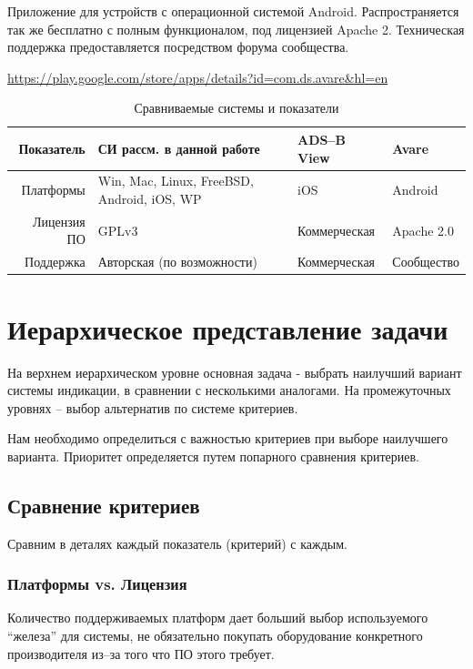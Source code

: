 \documentclass[a4paper,12pt]{report} %
\begin{document}
Приложение для устройств с операционной системой Android. Распространяется так
же бесплатно с полным функционалом, под лицензией Apache 2. Техническая
поддержка предоставляется посредством форума сообщества.

\url{https://play.google.com/store/apps/details?id=com.ds.avare&hl=en}


\begin{table}[!h]
  \caption{Сравниваемые системы и показатели}
  \begin{tabular}{ | r | p{6cm} | l | l |}
    \hline
    Показатель   & СИ рассм. в данной работе                  & ADS--B View   & Avare  \\
    \hline
    Платформы    & Win, Mac, Linux, FreeBSD, Android, iOS, WP & iOS           & Android \\
    \hline
    Лицензия ПО  & GPLv3                                      & Коммерческая  & Apache 2.0 \\
    \hline
    Поддержка    & Авторская (по возможности)                 & Коммерческая  & Сообщество \\
    \hline
  \end{tabular}
\end{table}

\section{Иерархическое представление задачи}

На верхнем иерархическом уровне основная задача - выбрать наилучший вариант
системы индикации, в сравнении с несколькими аналогами. На промежуточных уровнях
-- выбор альтернатив по системе критериев.

Нам необходимо определиться с важностью критериев при выборе наилучшего
варианта. Приоритет определяется путем попарного сравнения критериев.

\subsection{Сравнение критериев}

Сравним в деталях каждый показатель (критерий) с каждым.

\subsubsection{Платформы vs. Лицензия}

Количество поддерживаемых платформ дает больший выбор используемого ``железа''
для системы, не обязательно покупать оборудование конкретного производителя
из--за того что ПО этого требует.
\end{document}
